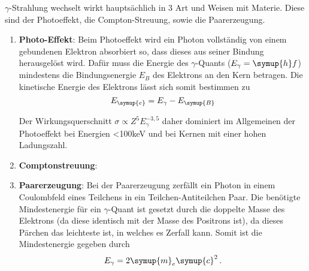 \noindent
$\gamma$-Strahlung wechselt wirkt hauptsächlich in 3 Art und Weisen mit Materie. 
Diese sind der Photoeffekt, die Compton-Streuung, sowie die Paarerzeugung.
\begin{enumerate}
  \item \textbf{Photo-Effekt}:
  Beim Photoeffekt wird ein Photon vollständig von einem gebundenen Elektron absorbiert so, dass dieses aus seiner Bindung herausgelöst wird. 
  Dafür muss die Energie des $\gamma$-Quants ($E_\gamma = \symup{h}f$) mindestens die Bindungsenergie $E_B$ des Elektrons an den Kern betragen. Die
  kinetische Energie des Elektrons lässt sich somit bestimmen zu 
  \begin{equation}
    E_{\symup{e}} = E_\gamma - E_{\symup{B}}
    \label{eqn:1}
  \end{equation}

  \noindent
  Der Wirkungsquerschnitt $\sigma \propto Z^5E_\gamma^{-3,5}$ daher dominiert im Allgemeinen 
  der Photoeffekt bei Energien <100keV und bei Kernen mit einer hohen Ladungszahl.

  \item \textbf{Comptonstreuung}:

  \item \textbf{Paarerzeugung}:
  Bei der Paarerzeugung zerfällt ein Photon in einem Coulombfeld eines Teilchens in ein Teilchen-Antiteilchen Paar.
  Die benötigte Mindestenergie für ein $\gamma$-Quant ist gesetzt durch die doppelte Masse des Elektrons (da diese
  identisch mit der Masse des Positrons ist), da dieses Pärchen das leichteste ist, in welches es Zerfall kann.
  Somit ist die Mindestenergie gegeben durch 
  \begin{equation}
    E_\gamma =  2 \symup{m}_e \symup{c}^2 \, .
    \label{eqn:3}
  \end{equation}

\end{enumerate}





